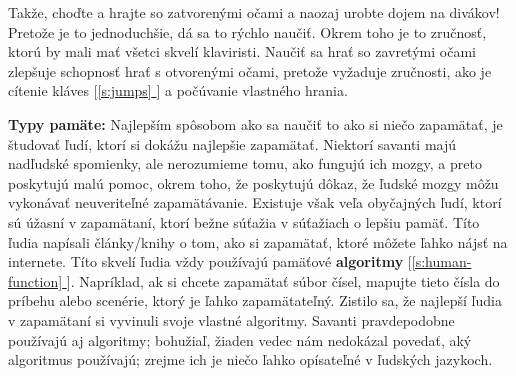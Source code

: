 \documentclass[11pt,a4paper]{book}
\newcommand*{\fullref}[1]{\hyperref[{#1}]{\ref*{#1} \nameref*{#1}}} %
\newcommand*{\fullrefp}[1]{[\fullref{#1}]} %
\begin{document}
Takže, choďte a hrajte so zatvorenými očami a naozaj urobte dojem na divákov! Pretože je to jednoduchšie, dá sa to rýchlo naučiť. Okrem toho je to zručnosť, ktorú by mali mať všetci skvelí klaviristi. Naučiť sa hrať so zavretými očami zlepšuje schopnosť hrať s otvorenými očami, pretože vyžaduje zručnosti, ako je cítenie kláves \fullrefp{s:jumps} a počúvanie vlastného hrania.

\textbf{Typy pamäte:} Najlepším spôsobom ako sa naučiť to ako si niečo zapamätať, je študovať ľudí, ktorí si dokážu najlepšie zapamätať. Niektorí savanti majú nadľudské spomienky, ale nerozumieme tomu, ako fungujú ich mozgy, a preto poskytujú malú pomoc, okrem toho, že poskytujú dôkaz, že ľudské mozgy môžu vykonávať neuveriteľné zapamätávanie. Existuje však veľa obyčajných ľudí, ktorí sú úžasní v zapamätaní, ktorí bežne súťažia v súťažiach o lepšiu  pamäť. Títo ľudia napísali články/knihy o tom, ako si zapamätať, ktoré môžete ľahko nájsť na internete. Títo skvelí ľudia vždy používajú pamäťové \textbf{algoritmy} \fullrefp{s:human-function}. Napríklad, ak si chcete zapamätať súbor čísel, mapujte tieto čísla do príbehu alebo scenérie, ktorý je ľahko zapamätateľný. Zistilo sa, že najlepší ľudia v zapamätaní si vyvinuli svoje vlastné algoritmy. Savanti pravdepodobne používajú aj algoritmy; bohužiaľ, žiaden vedec nám nedokázal povedať, aký algoritmus používajú; zrejme ich je niečo ľahko opísateľné v ľudských jazykoch.


\end{document}
